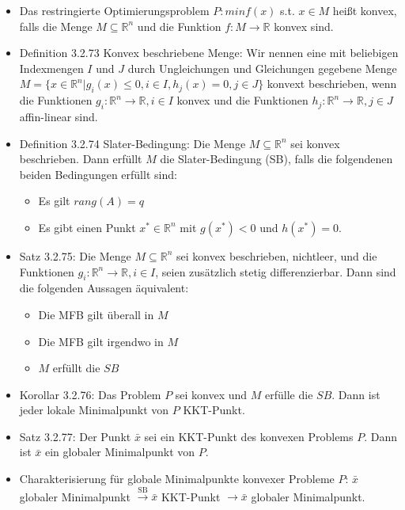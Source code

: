 \documentclass[paper=a4, fontsize=11pt]{scrartcl} %
\numberwithin{equation}{section} %
\numberwithin{figure}{section} %
\numberwithin{table}{section} %
\begin{document}
\begin{itemize}
  \item Das restringierte Optimierungsproblem $P: min f(x)$ s.t. $x \in M$ heißt konvex, falls die Menge $M \subseteq \mathbb{R}^n$ und die Funktion $f: M \rightarrow \mathbb{R}$ konvex sind.
  \item Definition 3.2.73 Konvex beschriebene Menge: Wir nennen eine mit beliebigen Indexmengen $I$ und $J$ durch Ungleichungen und Gleichungen gegebene Menge $M = \{ x \in \mathbb{R}^n | g_i(x) \le 0, i \in I, h_j(x) = 0, j \in J\}$ konvext beschrieben, wenn die Funktionen $g_i: \mathbb{R}^n \rightarrow \mathbb{R}, i \in I$ konvex und die Funktionen $h_j: \mathbb{R}^n \rightarrow \mathbb{R}, j \in J$ affin-linear sind.
  \item Definition 3.2.74 Slater-Bedingung: Die Menge $M \subseteq \mathbb{R}^n$ sei konvex beschrieben. Dann erfüllt $M$ die Slater-Bedingung (SB), falls die folgendenen beiden Bedingungen erfüllt sind:
  \begin{itemize}
    \item Es gilt $rang(A) = q$
    \item Es gibt einen Punkt $x^* \in \mathbb{R}^n$ mit $g(x^*) < 0$ und $h(x^*) = 0$.
  \end{itemize}
  \item Satz 3.2.75: Die Menge $M \subseteq \mathbb{R}^n$ sei konvex beschrieben, nichtleer, und die Funktionen $g_i: \mathbb{R}^n \rightarrow \mathbb{R}, i \in I$, seien zusätzlich stetig differenzierbar. Dann sind die folgenden Aussagen äquivalent:
  \begin{itemize}
    \item Die MFB gilt überall in $M$
    \item Die MFB gilt irgendwo in $M$
    \item $M$ erfüllt die $SB$
  \end{itemize}
  \item Korollar 3.2.76: Das Problem $P$ sei konvex und $M$ erfülle die $SB$. Dann ist jeder lokale Minimalpunkt von $P$ KKT-Punkt.
  \item Satz 3.2.77: Der Punkt $\bar{x}$ sei ein KKT-Punkt des konvexen Problems $P$. Dann ist $\bar{x}$ ein globaler Minimalpunkt von $P$.
  \item Charakterisierung für globale Minimalpunkte konvexer Probleme $P$: $\bar{x}$ globaler Minimalpunkt $\xrightarrow{\text{SB}} \bar{x}$ KKT-Punkt $\rightarrow \bar{x}$ globaler Minimalpunkt.
\end{itemize}
\end{document}
